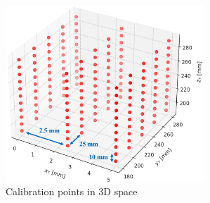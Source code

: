 \documentclass[twocolumn,a4j]{jsarticle}
\begin{document}
\begin{figure}[htbp]
  \centering
  \includegraphics[keepaspectratio, width=75mm]{../images/Calibration/Calibration_points_in_3D_space.png}
  \caption{Calibration points in 3D space}
\end{figure}
\end{document}
